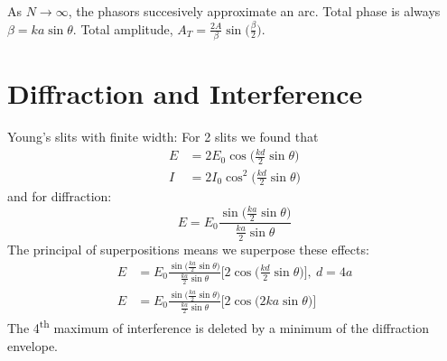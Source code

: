 \documentclass[a4paper, 11pt, normalem]{report}
\begin{document}
As $N \rightarrow \infty$, the phasors succesively approximate an arc.
Total phase is always $\beta = ka\sin{\theta}$.
Total amplitude, $A_{T} = \frac{2A}{\beta}\sin{\Big(\frac{\beta}{2}\Big)}$.

\section{Diffraction and Interference}
Young's slits with finite width: 
For 2 slits we found that
\begin{align}
    E &= 2E_{0}\cos{\Big(\frac{kd}{2}\sin{\theta}\Big)} \\
    I &= 2I_{0}\cos^{2}{\Big(\frac{kd}{2}\sin{\theta}\Big)}
\end{align}
and for diffraction:
\begin{equation}
    E = E_{0}\frac{\sin{\big(\tfrac{ka}{2}\sin{\theta}\big)}}{\tfrac{ka}{2}\sin{\theta}}
\end{equation}
The principal of superpositions means we superpose these effects:
\begin{align}
    E &= E_{0}\frac{\sin{\big(\tfrac{ka}{2}\sin{\theta}\big)}}{\tfrac{ka}{2}\sin{\theta}}\Big[2\cos{\Big(\frac{kd}{2}\sin{\theta}\Big)}\Big],~d = 4a \\
    E &= E_{0}\frac{\sin{\big(\tfrac{ka}{2}\sin{\theta}\big)}}{\tfrac{ka}{2}\sin{\theta}}\Big[2\cos{\Big(2ka\sin{\theta}\Big)}\Big]
\end{align}
The 4\textsuperscript{th} maximum of interference is deleted by a minimum of the diffraction envelope.
\end{document}
